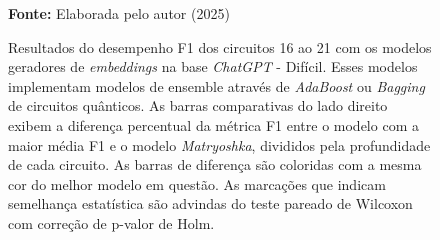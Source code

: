 \begin{figure}
\caption{Resultados do desempenho F1 dos circuitos 16 ao 21 com os modelos geradores de \textit{embeddings} na base \textit{ChatGPT} - Difícil. Esses modelos implementam modelos de ensemble através de \textit{AdaBoost} ou \textit{Bagging} de circuitos quânticos. As barras comparativas do lado direito exibem a diferença percentual da métrica F1 entre o modelo com a maior média F1 e o modelo \textit{Matryoshka}, divididos pela profundidade de cada circuito. As barras de diferença são coloridas com a mesma cor do melhor modelo em questão. As marcações que indicam semelhança estatística são advindas do teste pareado de Wilcoxon com correção de p-valor de Holm.}
\label{fig:model_transformer:hard:g6}
     \centering
    \centering

      \par\medskip\ABNTEXfontereduzida\selectfont\textbf{Fonte:} Elaborada pelo autor (2025) \par\medskip
\end{figure}